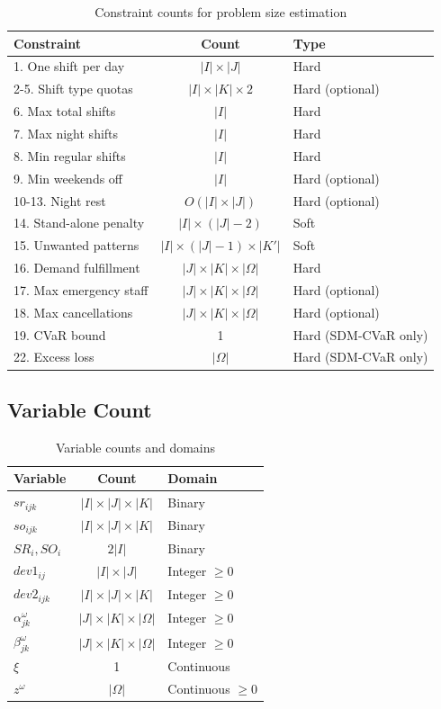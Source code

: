 \documentclass[12pt,a4paper]{article}
\begin{document}
\begin{table}[h]
\centering
\begin{tabular}{|l|c|l|}
\hline
\textbf{Constraint} & \textbf{Count} & \textbf{Type} \\
\hline
1. One shift per day & $|I| \times |J|$ & Hard \\
2-5. Shift type quotas & $|I| \times |K| \times 2$ & Hard (optional) \\
6. Max total shifts & $|I|$ & Hard \\
7. Max night shifts & $|I|$ & Hard \\
8. Min regular shifts & $|I|$ & Hard \\
9. Min weekends off & $|I|$ & Hard (optional) \\
10-13. Night rest & $O(|I| \times |J|)$ & Hard (optional) \\
14. Stand-alone penalty & $|I| \times (|J|-2)$ & Soft \\
15. Unwanted patterns & $|I| \times (|J|-1) \times |K'|$ & Soft \\
16. Demand fulfillment & $|J| \times |K| \times |\Omega|$ & Hard \\
17. Max emergency staff & $|J| \times |K| \times |\Omega|$ & Hard (optional) \\
18. Max cancellations & $|J| \times |K| \times |\Omega|$ & Hard (optional) \\
19. CVaR bound & 1 & Hard (SDM-CVaR only) \\
22. Excess loss & $|\Omega|$ & Hard (SDM-CVaR only) \\
\hline
\end{tabular}
\caption{Constraint counts for problem size estimation}
\end{table}

\subsection{Variable Count}

\begin{table}[h]
\centering
\begin{tabular}{|l|c|l|}
\hline
\textbf{Variable} & \textbf{Count} & \textbf{Domain} \\
\hline
$sr_{ijk}$ & $|I| \times |J| \times |K|$ & Binary \\
$so_{ijk}$ & $|I| \times |J| \times |K|$ & Binary \\
$SR_i, SO_i$ & $2|I|$ & Binary \\
$dev1_{ij}$ & $|I| \times |J|$ & Integer $\geq 0$ \\
$dev2_{ijk}$ & $|I| \times |J| \times |K|$ & Integer $\geq 0$ \\
$\alpha_{jk}^\omega$ & $|J| \times |K| \times |\Omega|$ & Integer $\geq 0$ \\
$\beta_{jk}^\omega$ & $|J| \times |K| \times |\Omega|$ & Integer $\geq 0$ \\
$\xi$ & 1 & Continuous \\
$z^\omega$ & $|\Omega|$ & Continuous $\geq 0$ \\
\hline
\end{tabular}
\caption{Variable counts and domains}
\end{table}
\end{document}
